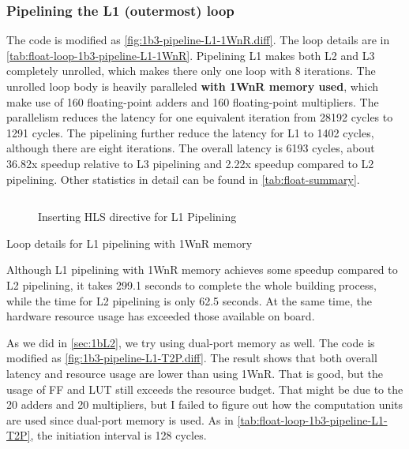 \subsubsection{Pipelining the L1 (outermost) loop}\label{sec:1bL1}

The code is modified as \autoref{fig:1b3-pipeline-L1-1WnR.diff}.
The loop details are in \autoref{tab:float-loop-1b3-pipeline-L1-1WnR}.
Pipelining L1 makes both L2 and L3 completely unrolled, which makes there only one loop with 8 iterations.
The unrolled loop body is heavily paralleled \textbf{with 1WnR memory used}, which make use of 160 floating-point adders and 160 floating-point multipliers.
The parallelism reduces the latency for one equivalent iteration from 28192 cycles to 1291 cycles.
The pipelining further reduce the latency for L1 to 1402 cycles, although there are eight iterations.
The overall latency is 6193 cycles, about 36.82x speedup relative to L3 pipelining and 2.22x speedup compared to L2 pipelining.
Other statistics in detail can be found in \autoref{tab:float-summary}.

\begin{figure}[ht!]
    \centering
    \inputminted[firstline=3]{diff}{program/1b3-pipeline-L1-1WnR.diff}
    \caption{Inserting HLS directive for L1 Pipelining}\label{fig:1b3-pipeline-L1-1WnR.diff}
\end{figure}

\begin{table}[ht!]
    \caption{Loop details for L1 pipelining with 1WnR memory}
    \label{tab:float-loop-1b3-pipeline-L1-1WnR}
    \centering
    
\end{table}

Although L1 pipelining with 1WnR memory achieves some speedup compared to L2 pipelining, it takes 299.1 seconds to complete the whole building process, while the time for L2 pipelining is only 62.5 seconds.
At the same time, the hardware resource usage has exceeded those available on board.

As we did in \autoref{sec:1bL2}, we try using dual-port memory as well.
The code is modified as \autoref{fig:1b3-pipeline-L1-T2P.diff}.
The result shows that both overall latency and resource usage are lower than using 1WnR.
That is good, but the usage of FF and LUT still exceeds the resource budget.
That might be due to the 20 adders and 20 multipliers, but I failed to figure out how the computation units are used since dual-port memory is used.
As in \autoref{tab:float-loop-1b3-pipeline-L1-T2P}, the initiation interval is 128 cycles.

